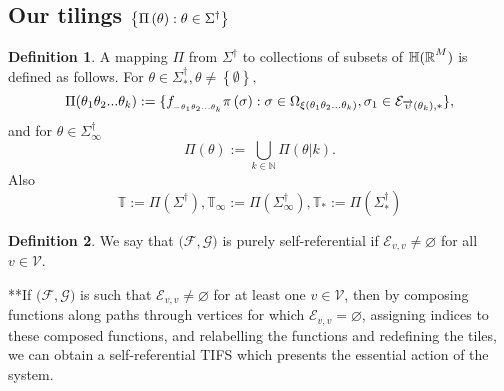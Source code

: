 \documentclass{amsproc}
\theoremstyle{plain}
\theoremstyle{definition}
\newtheorem{definition}{Definition}
\numberwithin{equation}{section}
\begin{document}
\subsection{Our tilings $\left\{ \Pi\left( \protect\theta\right) :\protect%
\theta\in \Sigma^{\dag}\right\} $}

\begin{definition}
A mapping $\Pi$ from ${\Sigma}^{\dag}$ to collections of subsets of $\mathbb{%
H(R}^{M})$ is defined as follows. For $\theta\in\Sigma_{\ast}^{\dag
},\theta\neq\left\{ \emptyset\right\} ,$%
\begin{equation*}
\Pi(\theta_{1}\theta_{2}...\theta_{k}):=\{f_{_{-\theta_{1}\theta_{2}...%
\theta_{k}}}\pi\left( \sigma\right) :\sigma\in\Omega_{\xi(\theta
_{1}\theta_{2}...\theta_{k})},\sigma_{1}\in\mathcal{E}_{\overrightarrow{%
\upsilon}(\theta_{k}),\ast}\},
\end{equation*}
and for $\theta\in\Sigma_{\infty}^{\dag}$ 
\begin{equation*}
\Pi(\theta):=\bigcup\limits_{k\in\mathbb{N}}\Pi(\theta|k).
\end{equation*}
Also 
\begin{equation*}
\mathbb{T}:=\Pi\left( \Sigma^{\dag}\right) ,\mathbb{T}_{\infty}:=\Pi\left(
\Sigma_{\infty}^{\dag}\right) ,\mathbb{T}_{\ast}:=\Pi\left( \Sigma_{\ast
}^{\dag}\right)
\end{equation*}
\end{definition}

\begin{definition}
We say that $(\mathcal{F},\mathcal{G)}$ is purely self-referential if $%
\mathcal{E}_{v,v}\neq\varnothing$ for all $v\in\mathcal{V}$.
\end{definition}

**If $(\mathcal{F},\mathcal{G)}$ is such that $\mathcal{E}%
_{v,v}\neq\varnothing$ for at least one $v\in\mathcal{V}$, then by composing
functions along paths through vertices for which $\mathcal{E}%
_{v,v}=\varnothing$, assigning indices to these composed functions, and
relabelling the functions and redefining the tiles, we can obtain a
self-referential TIFS which presents the essential action of the system.
\end{document}
